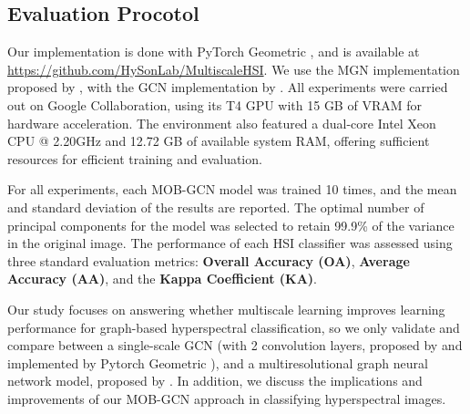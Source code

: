 \subsection{Evaluation Procotol} \label{sec:evaluation}

Our implementation is done with PyTorch Geometric \citep{pytorch} \citep{pytorchgeometric}, and is available at \url{https://github.com/HySonLab/MultiscaleHSI}. We use the MGN implementation proposed by \cite{hy2019covariant}, with the GCN implementation by \citep{pytorchgeometric}. All experiments were carried out on Google Collaboration, using its T4 GPU with 15 GB of VRAM for hardware acceleration. The environment also featured a dual-core Intel Xeon CPU @ 2.20GHz and 12.72 GB of available system RAM, offering sufficient resources for efficient training and evaluation.

For all experiments, each MOB-GCN model was trained 10 times, and the mean and standard deviation of the results are reported. The optimal number of principal components for the model was selected to retain 99.9\% of the variance in the original image. The performance of each HSI classifier was assessed using three standard evaluation metrics: \textbf{Overall Accuracy (OA)}, \textbf{Average Accuracy (AA)}, and the \textbf{Kappa Coefficient (KA)}.

Our study focuses on answering whether multiscale learning improves learning performance for graph-based hyperspectral classification, so we only validate and compare between a single-scale GCN (with 2 convolution layers, proposed by \citep{kipf2016} and implemented by Pytorch Geometric \cite{pytorchgeometric}), and a multiresolutional graph neural network model, proposed by \citep{Hy_2023}. In addition, we discuss the implications and improvements of our MOB-GCN approach in classifying hyperspectral images.